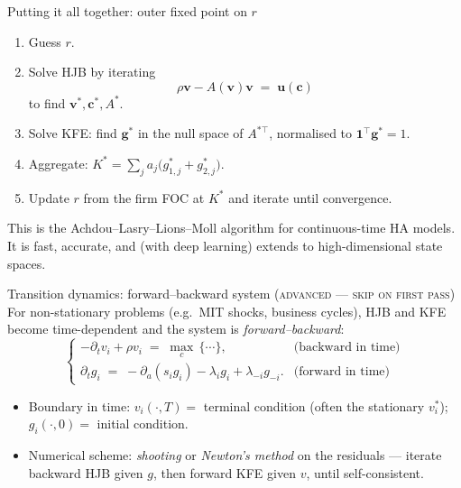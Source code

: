 \begin{frame}{Putting it all together: outer fixed point on $r$}
\begin{enumerate}
\item Guess $r$.
\medskip
\item Solve HJB by iterating
\[
\rho \mathbf v - A(\mathbf v)\mathbf v \;=\; \mathbf u(\mathbf c)
\]
to find $\mathbf v^*, \mathbf c^*, A^*$.
\medskip
\item Solve KFE: find $\mathbf g^*$ in the null space of $A^{*\top}$, normalised to $\mathbf 1^\top \mathbf g^* = 1$.
\medskip
\item Aggregate: $K^* = \sum_j a_j \big(g^*_{1,j} + g^*_{2,j}\big)$.
\medskip
\item Update $r$ from the firm FOC at $K^*$ and iterate until convergence.
\end{enumerate}
\medskip

This is the Achdou--Lasry--Lions--Moll algorithm for continuous-time HA models. It is fast, accurate, and (with deep learning) extends to high-dimensional state spaces.
\end{frame}

\begin{frame}{Transition dynamics: forward--backward system \textsc{(advanced --- skip on first pass)}}
For non-stationary problems (e.g.\ MIT shocks, business cycles), HJB and KFE become time-dependent and the system is \emph{forward--backward}:
\[
\begin{cases}
-\partial_t v_i + \rho v_i \;=\; \max_c\,\{\cdots\}, & \text{(backward in time)}\\[0.4em]
\partial_t g_i \;=\; -\partial_a(s_i g_i) - \lambda_i g_i + \lambda_{-i} g_{-i}. & \text{(forward in time)}
\end{cases}
\]
\medskip
\begin{itemize}
\item Boundary in time: $v_i(\cdot, T) = $ terminal condition (often the stationary $v_i^*$); $g_i(\cdot, 0) = $ initial condition.
\medskip
\item Numerical scheme: \emph{shooting} or \emph{Newton's method} on the residuals --- iterate backward HJB given $g$, then forward KFE given $v$, until self-consistent.
\end{itemize}
\end{frame}

